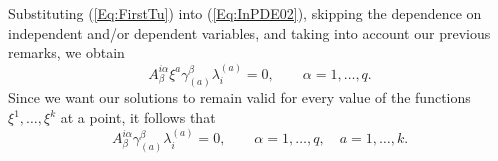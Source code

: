 \documentclass{birkjour}
\theoremstyle{definition}
\theoremstyle{remark}
\numberwithin{equation}{section}
\numberwithin{equation}{section}
\numberwithin{thm}{section}
\numberwithin{equation}{section}
\numberwithin{thm}{section}
\begin{document}
Substituting (\ref{Eq:FirstTu})  into (\ref{Eq:InPDE02}), skipping the dependence on independent and/or dependent variables, and taking into account our previous remarks, we obtain
\begin{equation}\label{Eq:Hyd}
	A^{i\alpha}_\beta\xi^a\gamma_{(a)}^\beta\lambda^{(a)}_i=0,\qquad \alpha=1,\ldots,q.
\end{equation}
Since we want our solutions to remain valid for every value of the functions $\xi^1,\ldots,\xi^k$ at a point, it follows that
\begin{equation}\label{Eq:Hyd2}
	A^{i\alpha}_\beta\gamma_{(a)}^\beta\lambda^{(a)}_i=0,\qquad \alpha=1,\ldots,q,\quad a=1,\ldots,k.
\end{equation}
\end{document}
